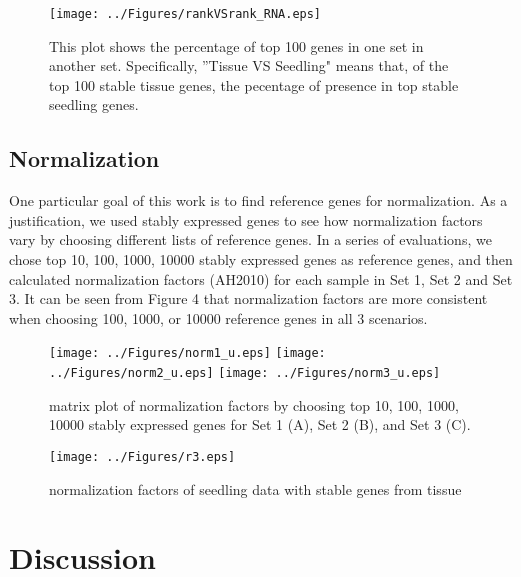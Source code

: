 \documentclass[11pt, a4paper]{article}
\begin{document}
 \begin{figure}[h!]
\begin{center}
\texttt{[image: ../Figures/rankVSrank\_RNA.eps]}
\caption{\label{rankVSrank_RNA} This plot shows the percentage of top 100 genes in one set  in another set. Specifically, ''Tissue VS Seedling" means that, of the top 100 stable tissue genes, the pecentage of presence in top stable seedling genes.}
\end{center}
\end{figure}


\subsection{Normalization}
One particular goal of this work is to find reference genes for normalization. As a justification, we used stably expressed genes to see how normalization factors vary by choosing different lists of reference genes.   In a series of evaluations, we chose top 10, 100, 1000, 10000 stably expressed genes as reference genes, and then calculated normalization factors \citep{anders2010differential}(AH2010) for each sample in Set 1, Set 2 and Set 3. It can be seen from Figure 4 that normalization factors are more consistent when choosing 100, 1000, or 10000 reference genes in all 3 scenarios. 

 \begin{figure}[h!]
\begin{center}
\texttt{[image: ../Figures/norm1\_u.eps]}
\texttt{[image: ../Figures/norm2\_u.eps]}
\texttt{[image: ../Figures/norm3\_u.eps]}

\caption{\label{fig:scaled_diss} matrix plot of normalization factors by choosing top 10, 100, 1000, 10000 stably expressed genes for Set 1 (A), Set 2 (B), and Set 3 (C). }
\end{center}
\end{figure}

 \begin{figure}[h!]
\begin{center}
\texttt{[image: ../Figures/r3.eps]}
\caption{\label{fig:scaled_diss} normalization factors of seedling data with stable genes from tissue }
\end{center}
\end{figure}

  \section{Discussion}
  
\end{document}
